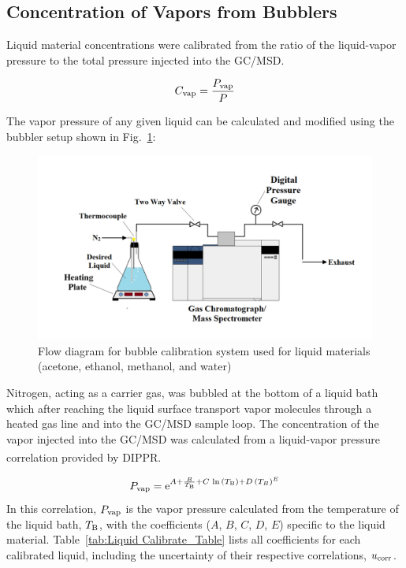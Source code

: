\documentclass[12pt]{article}
\begin{document}
\pagebreak
\subsection{Concentration of Vapors from Bubblers}
\label{sssec:Concentration of Vapors from Bubblers}

Liquid material concentrations were calibrated from the ratio of the liquid-vapor pressure to the total pressure injected into the GC/MSD.

\begin{equation}
\label{eq:liquid_vapor_concentration}
C_{\rm vap} =\frac {P_{\rm vap}}{P}
\end{equation}

The vapor pressure of any given liquid can be calculated and modified using the bubbler setup shown in Fig.~\ref{fig:Bubbler}:

\begin{figure}[h!]
	\centering
\includegraphics[width=\textwidth,keepaspectratio]{Bubbler_Setup.png}
	\caption[Flow diagram for bubble calibration system used for liquid materials]{Flow diagram for bubble calibration system used for liquid materials (acetone, ethanol, methanol, and water)}
	\label{fig:Bubbler}
\end{figure}
Nitrogen, acting as a carrier gas, was bubbled at the bottom of a liquid bath which after reaching the liquid surface transport vapor molecules through a heated gas line and into the GC/MSD sample loop. The concentration of the vapor injected into the GC/MSD was calculated from a liquid-vapor pressure correlation provided by DIPPR\textsuperscript{\textregistered}.

\begin{equation}
\label{eq:liquid_vapor_pressure_correlation}
P_{\rm vap} ={\rm e}^{A+\frac{B}{T_{\rm B}}+C\,\ln{(T_{\rm B})}+D\,(T_{B})^{E}}
\end{equation}
In this correlation, $P_{\rm vap}$ is the vapor pressure calculated from the temperature of the liquid bath, $T_{\rm B}$, with the coefficients ($A$, $B$, $C$, $D$, $E$) specific to the liquid material. Table~\ref{tab:Liquid Calibrate_Table} lists all coefficients for each calibrated liquid, including the uncertainty of their respective correlations, $u_{\rm corr}$.
\end{document}
